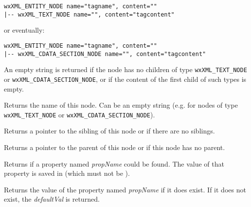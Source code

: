 \begin{verbatim}
wxXML_ENTITY_NODE name="tagname", content=""
|-- wxXML_TEXT_NODE name="", content="tagcontent"
\end{verbatim}

or eventually:

\begin{verbatim}
wxXML_ENTITY_NODE name="tagname", content=""
|-- wxXML_CDATA_SECTION_NODE name="", content="tagcontent"
\end{verbatim}

An empty string is returned if the node has no children of type \texttt{wxXML\_TEXT\_NODE} or \texttt{wxXML\_CDATA\_SECTION\_NODE}, or if the content of the first child of such types is empty.


\label{wxxmlnodegetname}


Returns the name of this node. Can be an empty string (e.g. for nodes of type {\tt wxXML\_TEXT\_NODE} or {\tt wxXML\_CDATA\_SECTION\_NODE}).

\label{wxxmlnodegetnext}


Returns a pointer to the sibling of this node or \NULL if there are no siblings.

\label{wxxmlnodegetparent}


Returns a pointer to the parent of this node or \NULL if this node has no parent.

\label{wxxmlnodegetpropval}


Returns \true if a property named {\it propName} could be found.
The value of that property is saved in  (which must not be \NULL).


Returns the value of the property named {\it propName} if it does exist.
If it does not exist, the {\it defaultVal} is returned.

\label{wxxmlnodegetproperties}

